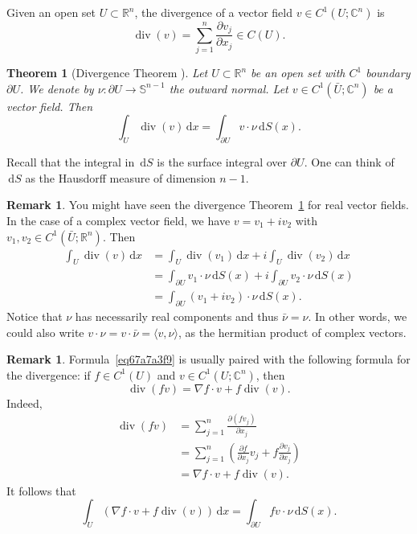 \documentclass[a4paper,9pt]{amsart}
\newcommand{\bb}[1]{\mathbb{#1}}
\newcommand{\R}{\mathbb{R}}	%
\newcommand{\C}{\mathbb{C}}	%
\newcommand{\did}{\,\mathrm{d}}	%
\newcommand{\de}{\partial}		%
\renewcommand{\div}{\operatorname{div}}	%
\newcommand{\grad}{\nabla}
\theoremstyle{plain}
\newtheorem{theorem}[proposition]{Theorem}
\theoremstyle{definition}
\newtheorem{remark}[proposition]{Remark}
\theoremstyle{remark}
\begin{document}
Given an open set $U\subset\R^n$,
the divergence of a vector field $v \in C^1(U;\C^n)$ is 
\[
\div(v) = \sum_{j=1}^n \frac{\de v_j}{\de x_j} \in C(U) .
\]

\begin{theorem}[Divergence Theorem {\cite[Lemma 10.1]{MR0447753}}]\label{teo67a7a31e}
	Let $U\subset\R^n$ be an open set with $C^1$ boundary $\de U$.
	We denote by $\nu:\de U\to\bb S^{n-1}$ the outward normal.
	Let $v\in C^1(\bar U;\C^n)$ be a vector field.
	Then
	\begin{equation}\label{eq67a7a3f9}
		\int_U \div(v) \did x = \int_{\de U} v\cdot \nu \did S(x) .
	\end{equation}
\end{theorem}

Recall that the integral in $\did S$ is the surface integral over $\de U$.
One can think of $\did S$ as the Hausdorff measure of dimension $n-1$.

\begin{remark}
	You might have seen the divergence Theorem~\ref{teo67a7a31e} for real vector fields.
	In the case of a complex vector field, we have
	$v = v_1 + i v_2$ with $v_1,v_2\in  C^1(\bar U;\R^n)$.
	Then
	\begin{align*}
		\int_U \div(v) \did x
		&= \int_U \div(v_1) \did x + i \int_U \div(v_2) \did x \\
		&= \int_{\de U} v_1\cdot \nu \did S(x) + i \int_{\de U} v_2\cdot \nu \did S(x) \\
		&= \int_{\de U} (v_1+iv_2)\cdot \nu \did S(x) .
	\end{align*}
	Notice that $\nu$ has necessarily real components and thus $\bar \nu = \nu$.
	In other words, we could also write $v\cdot \nu = v \cdot \bar \nu = \langle v,\nu \rangle$, as the hermitian product of complex vectors.
\end{remark}

\begin{remark}
	Formula~\eqref{eq67a7a3f9} is usually paired with the following formula for the divergence:
	if $f\in C^1(U)$ and $v\in C^1( U;\C^n)$, then
	\begin{equation}\label{eq67a7a587}
		\div(fv) = \grad f\cdot v + f\div(v) .
	\end{equation}
	Indeed,
	\begin{align*}
		\div(fv) 
		&= \sum_{j=1}^n \frac{\de (fv_j)}{\de x_j} \\
		&= \sum_{j=1}^n \left( \frac{\de f}{\de x_j} v_j + f \frac{\de v_j}{\de x_j} \right) \\
		&= \grad f\cdot v + f\div(v) .
	\end{align*}
	It follows that
	\[
	\int_U (\grad f\cdot v + f\div(v)) \did x = \int_{\de U} f v\cdot \nu \did S(x) .
	\]
\end{remark}
\end{document}
